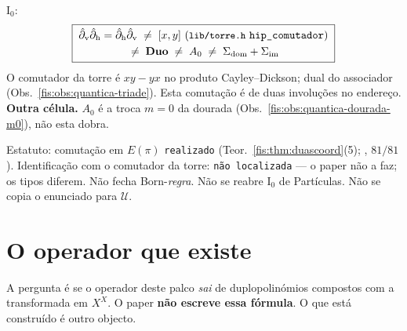 \documentclass[livro.tex]{subfiles}
\begin{document}
\begin{observacao}
\(\mathrm{I}_{0}\):
\[
\boxed{\;
\begin{gathered}
\hat\partial_{\mathrm{v}}\hat\partial_{\mathrm{h}}
=\hat\partial_{\mathrm{h}}\hat\partial_{\mathrm{v}}
\;\neq\;
[x,y]
\text{ (\texttt{\small lib/torre.h} \texttt{hip\_comutador})}
\\
\;\neq\;
\mathbf{Duo}
\;\neq\;
A_{0}
\;\neq\;
\Sigma_{\mathrm{dom}}+\Sigma_{\mathrm{im}}
\end{gathered}
\;}
\]
O comutador da torre é \(xy-yx\) no produto
Cayley--Dickson; dual do associador
(Obs.~\ref{fis:obs:quantica-triade}).
Esta comutação é de duas involuções no endereço.
\textbf{Outra célula.}
\(A_{0}\) é a troca \(m=0\) da dourada
(Obs.~\ref{fis:obs:quantica-dourada-m0}), não
esta dobra.

Estatuto: comutação em \(E(\pi)\)
\texttt{realizado}
(Teor.~\ref{fis:thm:duascoord}(5);
, \(81/81\)).
Identificação com o comutador da torre:
\texttt{não localizada} --- o paper não a faz;
os tipos diferem.
Não fecha Born-\emph{regra}.
Não se reabre \(\mathrm{I}_{0}\) de Partículas.
Não se copia o enunciado para \(\mathcal{U}\).
\end{observacao}

\section{O operador que existe}\label{fis:quantica-operador}

\noindent A pergunta é se o operador deste palco \emph{sai} de
duplopolinómios compostos com a transformada em \(X^{X}\). O paper
\textbf{não escreve essa fórmula}. O que está construído é outro
objecto.
\end{document}
